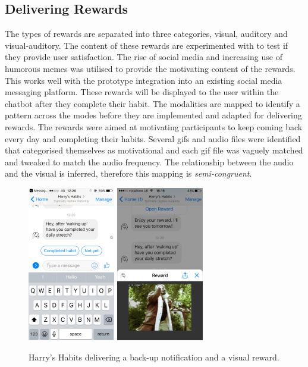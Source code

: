 \subsection*{Delivering Rewards}
The types of rewards are separated into three categories, visual, auditory and visual-auditory. The content of these rewards are experimented with to test if they provide user satisfaction. The rise of social media and increasing use of humorous memes was utilised to provide the motivating content of the rewards. This works well with the prototype integration into an existing social media messaging platform. These rewards will be displayed to the user within the chatbot after they complete their habit. The modalities are mapped to identify a pattern across the modes before they are implemented and adapted for delivering rewards. The rewards were aimed at motivating participants to keep coming back every day and completing their habits. Several gifs and audio files were identified that categorised themselves as motivational and each gif file was vaguely matched and tweaked to match the audio frequency. The relationship between the audio and the visual is inferred, therefore this mapping is \textit{semi-congruent}.

\begin{figure}[H]
  \centering
  \includegraphics[width=1.5in]{resources/figures/reminder.png}
  \hspace{10px}
  \includegraphics[width=1.5in]{resources/figures/reward-visual.png}
  \caption{Harry's Habits delivering a back-up notification and a visual reward.}
  \label{fig:setup_media_1}
\end{figure}


